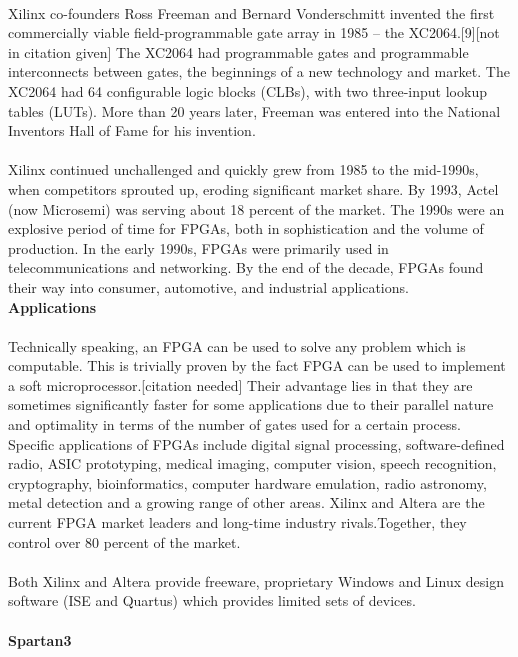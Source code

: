 \documentclass[14pt]{report}
\begin{document}
{\paragraph{} Xilinx co-founders Ross Freeman and Bernard Vonderschmitt invented the first commercially viable field-programmable gate array in 1985 – the XC2064.[9][not in citation given] The XC2064 had programmable gates and programmable interconnects between gates, the beginnings of a new technology and market. The XC2064 had 64 configurable logic blocks (CLBs), with two three-input lookup tables (LUTs). More than 20 years later, Freeman was entered into the National Inventors Hall of Fame for his invention.
\paragraph{} Xilinx continued unchallenged and quickly grew from 1985 to the mid-1990s, when competitors sprouted up, eroding significant market share. By 1993, Actel (now Microsemi) was serving about 18 percent of the market. The 1990s were an explosive period of time for FPGAs, both in sophistication and the volume of production. In the early 1990s, FPGAs were primarily used in telecommunications and networking. By the end of the decade, FPGAs found their way into consumer, automotive, and industrial applications.\\
\textbf{Applications}
\paragraph{} Technically speaking, an FPGA can be used to solve any problem which is computable. This is trivially proven by the fact FPGA can be used to implement a soft microprocessor.[citation needed] Their advantage lies in that they are sometimes significantly faster for some applications due to their parallel nature and optimality in terms of the number of gates used for a certain process.\\
Specific applications of FPGAs include digital signal processing, software-defined radio, ASIC prototyping, medical imaging, computer vision, speech recognition, cryptography, bioinformatics, computer hardware emulation, radio astronomy, metal detection and a growing range of other areas.
Xilinx and Altera are the current FPGA market leaders and long-time industry rivals.Together, they control over 80 percent of the market.
\paragraph{} Both Xilinx and Altera provide freeware, proprietary Windows and Linux design software (ISE and Quartus) which provides limited sets of devices.\\
\\
\textbf{Spartan3}
}
\end{document}
